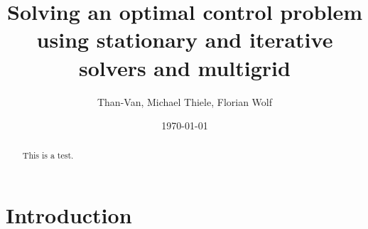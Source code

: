 \documentclass[twoside,reqno, 10pt, headinclude, footinclude]{amsart}
\theoremstyle{plain}
\theoremstyle{definition}
\numberwithin{equation}{section}
\begin{document}
\title[Reduced approach]{Solving an optimal control problem using stationary and iterative solvers and multigrid}

\author{Than-Van, Michael Thiele, Florian Wolf}
\date{\today}


\begin{abstract}
This is a test.
\end{abstract}
\maketitle
\tableofcontents


\section{Introduction}

\end{document}

